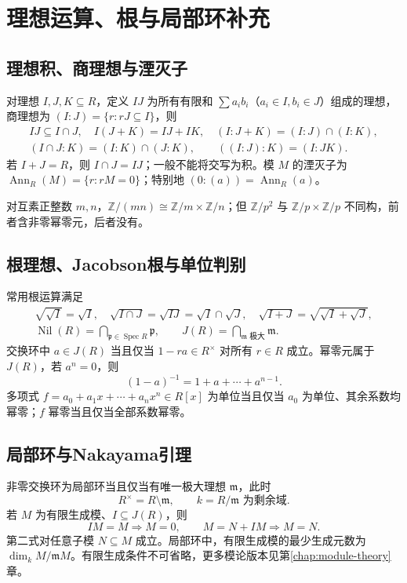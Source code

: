 \documentclass[../main.tex]{subfiles}
\begin{document}
\section{理想运算、根与局部环补充}
\subsection{理想积、商理想与湮灭子}
对理想 $I,J,K\subseteq R$，定义 $IJ$ 为所有有限和 $\sum a_ib_i$（$a_i\in I,b_i\in J$）组成的理想，商理想为 $(I:J)=\{r:rJ\subseteq I\}$，则
\begin{gather*}
IJ\subseteq I\cap J,\quad I(J+K)=IJ+IK,\quad
(I:J+K)=(I:J)\cap(I:K),\\
(I\cap J:K)=(I:K)\cap(J:K),\qquad
((I:J):K)=(I:JK).
\end{gather*}
若 $I+J=R$，则 $I\cap J=IJ$；一般不能将交写为积。模 $M$ 的湮灭子为 $\operatorname{Ann}_R(M)=\{r:rM=0\}$；特别地 $(0:(a))=\operatorname{Ann}_R(a)$。

对互素正整数 $m,n$，$\mathbb Z/(mn)\cong\mathbb Z/m\times\mathbb Z/n$；但 $\mathbb Z/p^2$ 与 $\mathbb Z/p\times\mathbb Z/p$ 不同构，前者含非零幂零元，后者没有。

\subsection{根理想、Jacobson根与单位判别}
常用根运算满足
\begin{gather*}
\sqrt{\sqrt I}=\sqrt I,\quad
\sqrt{I\cap J}=\sqrt{IJ}=\sqrt I\cap\sqrt J,\quad
\sqrt{I+J}=\sqrt{\sqrt I+\sqrt J},\\
\operatorname{Nil}(R)=\bigcap_{\mathfrak p\in\operatorname{Spec}R}\mathfrak p,\qquad
J(R)=\bigcap_{\mathfrak m\text{ 极大}}\mathfrak m.
\end{gather*}
交换环中 $a\in J(R)$ 当且仅当 $1-ra\in R^\times$ 对所有 $r\in R$ 成立。幂零元属于 $J(R)$，若 $a^n=0$，则
\[
(1-a)^{-1}=1+a+\cdots+a^{n-1}.
\]
多项式 $f=a_0+a_1x+\cdots+a_nx^n\in R[x]$ 为单位当且仅当 $a_0$ 为单位、其余系数均幂零；$f$ 幂零当且仅当全部系数幂零。

\subsection{局部环与Nakayama引理}
非零交换环为局部环当且仅当有唯一极大理想 $\mathfrak m$，此时
\[
R^\times=R\setminus\mathfrak m,\qquad k=R/\mathfrak m\text{ 为剩余域}.
\]
若 $M$ 为有限生成模、$I\subseteq J(R)$，则
\[
IM=M\Longrightarrow M=0,\qquad M=N+IM\Longrightarrow M=N.
\]
第二式对任意子模 $N\subseteq M$ 成立。局部环中，有限生成模的最少生成元数为 $\dim_k M/\mathfrak mM$。有限生成条件不可省略，更多模论版本见第\ref{chap:module-theory}章。
\end{document}
